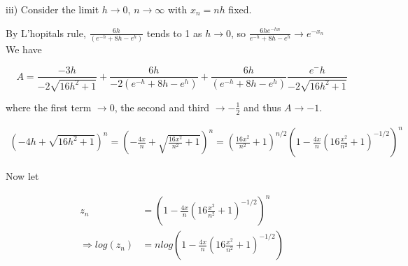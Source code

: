 \documentclass[10pt,a4paper]{report}
\begin{document}
iii) Consider the limit $h \rightarrow 0$, $n \rightarrow \infty$ with $x_n=nh$ fixed.\\ \vspace{0.2cm}

By L'hopitals rule, $\frac{6h}{(e^{-h} + 8h - e^h)}$ tends to 1 as $h \rightarrow 0$, so $\frac{6he^{-hn}}{e^{-h}+8h-e^h} \rightarrow e^{-x_n}$\\

We have

\begin{equation*}
A=
\frac{-3h}{-2\sqrt{16h^2+1}} + 
\frac{6h}{-2(e^{-h} + 8h - e^h)} +
\frac{6h}{(e^{-h} + 8h - e^h)}
\frac{e^-h}{-2\sqrt{16h^2+1}}
\end{equation*}

where the first term $\rightarrow 0$, the second and third $\rightarrow -\frac{1}{2}$ and thus $A\rightarrow -1$. %

\begin{align*}
(-4h+\sqrt{16h^2+1})^n = (-\frac{4x}{n}+\sqrt{\frac{16x^2}{n^2}+1})^n= (\frac{16x^2}{n^2}+1)^{n/2}(1-\frac{4x}{n}(16\frac{x^2}{n^2}+1)^{-1/2})^n
\end{align*}






Now let

\begin{align*}
z_n &= (1-\frac{4x}{n}(16\frac{x^2}{n^2}+1)^{-1/2})^n \\
\Rightarrow log(z_n)&=nlog(1-\frac{4x}{n}(16\frac{x^2}{n^2}+1)^{-1/2})
\end{align*}
\end{document}

